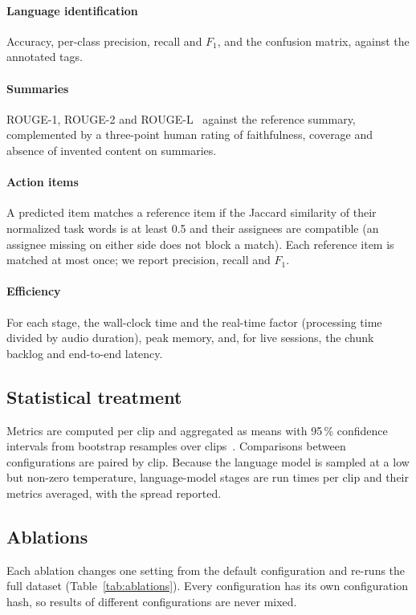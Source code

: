 \paragraph{Language identification}
Accuracy, per-class precision, recall and $F_1$, and the confusion matrix,
against the annotated tags.

\paragraph{Summaries}
ROUGE-1, ROUGE-2 and ROUGE-L~\cite{lin2004rouge} against the reference summary,
complemented by a three-point human rating of faithfulness, coverage and absence
of invented content on  summaries.

\paragraph{Action items}
A predicted item matches a reference item if the Jaccard similarity of their
normalized task words is at least 0.5 and their assignees are compatible (an
assignee missing on either side does not block a match). Each reference item
is matched at most once; we report precision, recall and $F_1$.

\paragraph{Efficiency}
For each stage, the wall-clock time and the real-time factor (processing time
divided by audio duration), peak memory, and, for live sessions, the chunk
backlog and end-to-end latency.

\subsection{Statistical treatment}
Metrics are computed per clip and aggregated as means with 95\,\% confidence
intervals from  bootstrap resamples over
clips~\cite{efron1993bootstrap}. Comparisons between configurations are paired
by clip. Because the language model is sampled at a low but non-zero temperature,
language-model stages are run  times per clip and their metrics
averaged, with the spread reported.

\subsection{Ablations}
Each ablation changes one setting from the default configuration and re-runs the
full dataset (Table~\ref{tab:ablations}). Every configuration has its own
configuration hash, so results of different configurations are never mixed.

